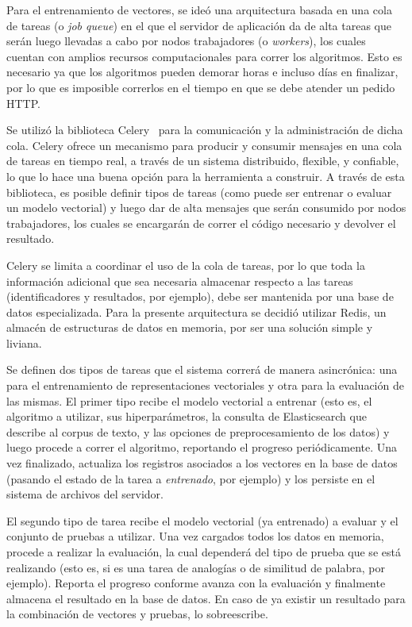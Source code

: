 Para el entrenamiento de vectores, se ideó una arquitectura basada en una cola de tareas (o
\textit{job queue}) en el que el servidor de aplicación da de alta tareas que serán luego llevadas a
cabo por nodos trabajadores (o \textit{workers}), los cuales cuentan con amplios recursos
computacionales para correr los algoritmos. Esto es necesario ya que los algoritmos pueden demorar
horas e incluso días en finalizar, por lo que es imposible correrlos en el tiempo en que se debe
atender un pedido HTTP\@.

Se utilizó la biblioteca Celery~\cite{Celery} para la comunicación y la administración de dicha
cola. Celery ofrece un mecanismo para producir y consumir mensajes en una cola de tareas en tiempo
real, a través de un sistema distribuido, flexible, y confiable, lo que lo hace una buena opción
para la herramienta a construir. A través de esta biblioteca, es posible definir tipos de tareas
(como puede ser entrenar o evaluar un modelo vectorial) y luego dar de alta mensajes que serán
consumido por nodos trabajadores, los cuales se encargarán de correr el código necesario y devolver
el resultado.

Celery se limita a coordinar el uso de la cola de tareas, por lo que toda la información adicional
que sea necesaria almacenar respecto a las tareas (identificadores y resultados, por ejemplo), debe
ser mantenida por una base de datos especializada. Para la presente arquitectura se decidió utilizar
Redis, un almacén de estructuras de datos en memoria, por ser una solución simple y liviana.

Se definen dos tipos de tareas que el sistema correrá de manera asincrónica: una para el
entrenamiento de representaciones vectoriales y otra para la evaluación de las mismas. El primer tipo
recibe el modelo vectorial a entrenar (esto es, el algoritmo a utilizar, sus hiperparámetros, la
consulta de Elasticsearch que describe al corpus de texto, y las opciones de preprocesamiento de los
datos) y luego procede a correr el algoritmo, reportando el progreso periódicamente. Una vez
finalizado, actualiza los registros asociados a los vectores en la base de datos (pasando el estado
de la tarea a \textit{entrenado}, por ejemplo) y los persiste en el sistema de archivos del
servidor.

El segundo tipo de tarea recibe el modelo vectorial (ya entrenado) a evaluar y el conjunto de
pruebas a utilizar. Una vez cargados todos los datos en memoria, procede a realizar la evaluación,
la cual dependerá del tipo de prueba que se está realizando (esto es, si es una tarea de analogías o
de similitud de palabra, por ejemplo). Reporta el progreso conforme avanza con la evaluación y
finalmente almacena el resultado en la base de datos. En caso de ya existir un resultado para la
combinación de vectores y pruebas, lo sobreescribe.

